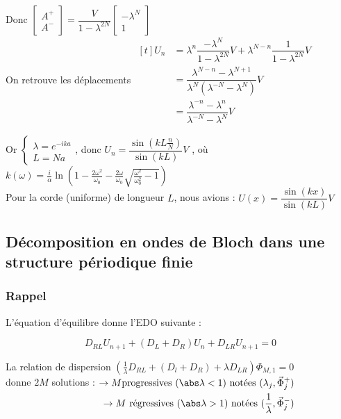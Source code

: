 \documentclass[12pt,a4paper]{article}
\begin{document}
\begin{sol}
	Donc $\begin{bmatrix}
		A^+ \\ A^-
	\end{bmatrix} = \dfrac V{1-\lambda^{2N}}\begin{bmatrix}
	-\lambda^N \\ 1
	\end{bmatrix}$\\
	On retrouve les déplacements $\begin{aligned}[t]
		U_n & = \lambda^n \dfrac{-\lambda^N}{1-\lambda^{2N}}V + \lambda^{N-n}\dfrac1{1-\lambda^{2N}}V \\
		& = \dfrac{\lambda^{N-n} - \lambda^{N+1}}{\lambda^N(\lambda^{-N}-\lambda^N)}V \\
		&= \dfrac{\lambda^{-n}-\lambda^n}{\lambda^{-N}-\lambda^N}V
	\end{aligned}$\\
	\begin{minipage}[t]{15cm}
		Or $\begin{cases}
		\lambda = e^{-ika} \\
		L = Na
	\end{cases}$, donc $U_n = \dfrac{\sin(kL\frac nN)}{\sin(kL)}V$ 
	, où $k(\omega)=\frac i\alpha\ln\left(1-\frac{2\omega^2}{\omega_0} - \frac{2\omega}{\omega_0}\sqrt{\frac{\omega^2}{\omega_0^2}-1}\right)$\\
	
	Pour la corde (uniforme) de longueur $L$, nous avions : $U(x) = \dfrac{\sin(kx)}{\sin(kL)} V$
	\end{minipage}	
\end{sol}

\subsection{Décomposition en ondes de Bloch dans une structure périodique finie}

\subsubsection{Rappel}
 L'équation d'équilibre donne l'EDO suivante :
 
 \[
 D_{RL} U_{n+1} + (D_L+D_R)U_n + D_{LR} U_{n+1} = 0
 \]
	
La relation de dispersion $\left(\frac1\lambda D_{RL} + (D_l+D_R) + \lambda D_{LR}\right)\Phi_{M,1} = 0$\\

donne $2M$ solutions : $\begin{aligned}[t]
	\to M \text{progressives ($\abs\lambda <1$) notées ($\lambda_j,\vec\Phi_j^+$)}\\
	\to M \text{ régressives ($\abs\lambda > 1$) notées ($\frac1\lambda, \vec\Phi_j^-$)}
\end{aligned}$\\
\end{document}
